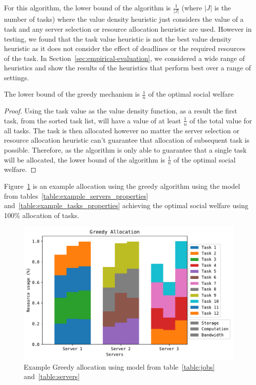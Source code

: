 For this algorithm, the lower bound of the algorithm is $\frac{1}{\left|J\right|}$ (where $\left|J\right|$ is the
number of tasks) where the value density heuristic just considers the value of a task and any server selection or
resource allocation heuristic are used. However in testing, we found that the task value heuristic is not the best
value density heuristic as it does not consider the effect of deadlines or the required resources of the task. In
Section~\ref{sec:empirical-evaluation}, we considered a wide range of heuristics and show the results of the heuristics
that perform best over a range of settings.

\begin{theorem}
    The lower bound of the greedy mechanism is $\frac{1}{n}$ of the optimal social welfare
\end{theorem}
\begin{proof}
    Using the task value as the value density function, as a result the first task, from the sorted task list, will
    have a value of at least $\frac{1}{n}$ of the total value for all tasks. The task is then allocated however no
    matter the server selection or resource allocation heuristic can't guarantee that allocation of subsequent task is
    possible. Therefore, as the algorithm is only able to guarantee that a single task will be allocated, the lower
    bound of the algorithm is $\frac{1}{n}$ of the optimal social welfare.
\end{proof}

Figure~\ref{fig:greedy_allocation} is an example allocation using the greedy algorithm using the model from
tables~\ref{table:example_servers_properties} and~\ref{table:example_tasks_properties} achieving the optimal social
welfare using 100\% allocation of tasks. %
\begin{figure}[H]
    \includegraphics[width=\linewidth]{figs/allocation/greedy_allocation.pdf}
    \caption{Example Greedy allocation using model from table~\ref{table:jobs} and~\ref{table:servers}}
    \label{fig:greedy_allocation}
\end{figure}

